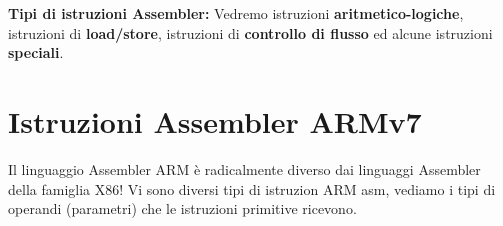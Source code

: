 \begin{defn}
	\textbf{Tipi di istruzioni Assembler:}
	Vedremo istruzioni \textbf{aritmetico-logiche}, istruzioni di \textbf{load/store}, istruzioni di \textbf{controllo di flusso} ed alcune istruzioni \textbf{speciali}.
\end{defn}

\section{Istruzioni Assembler ARMv7}

\begin{note}
	Il linguaggio Assembler ARM è radicalmente diverso dai linguaggi Assembler della famiglia X86! Vi sono diversi tipi di istruzion ARM asm, vediamo i tipi di operandi (parametri) che le istruzioni primitive ricevono.
\end{note}

